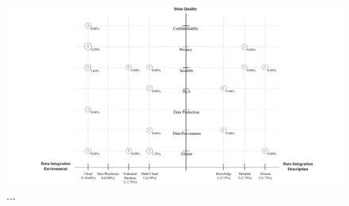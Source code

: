 \begin{figure}[h!]
\centering
\includegraphics[scale=0.5]{figs/bubble-charts/Data-Quality-DI.pdf}
\caption{...}
\end{figure}
